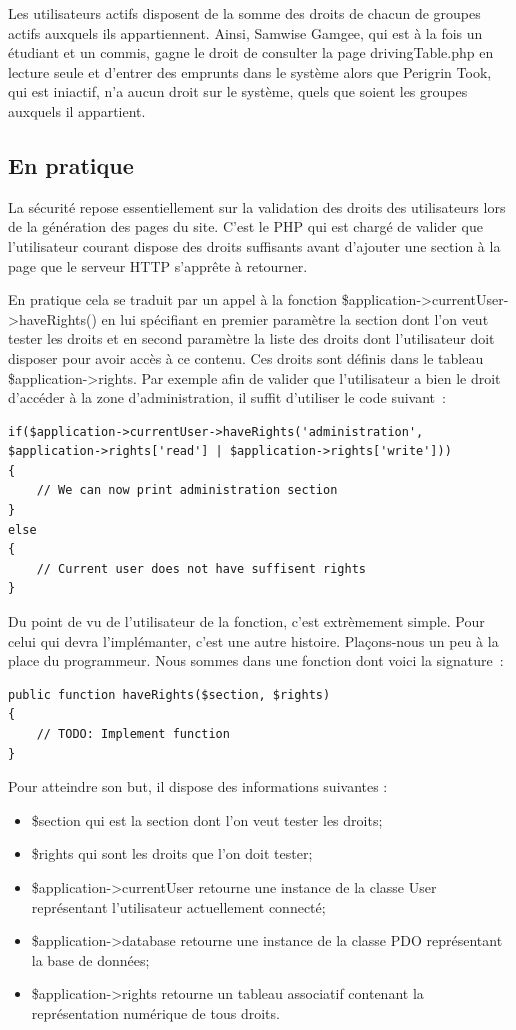 \documentclass[letter, 10pt]{report}
\begin{document}
Les utilisateurs actifs disposent de la somme des droits de chacun de groupes actifs auxquels ils appartiennent. Ainsi, Samwise Gamgee, qui est à la fois un étudiant et un commis, gagne le droit de consulter la page drivingTable.php en lecture seule et d'entrer des emprunts dans le système alors que Perigrin Took, qui est iniactif, n'a aucun droit sur le système, quels que soient les groupes auxquels il appartient.

\subsection{En pratique}
La sécurité repose essentiellement sur la validation des droits des utilisateurs lors de la génération des pages du site. C'est le PHP qui est chargé de valider que l'utilisateur courant dispose des droits suffisants avant d'ajouter une section à la page que le serveur HTTP s’apprête à retourner.

En pratique cela se traduit par un appel à la fonction \$application->currentUser->haveRights() en lui spécifiant en premier paramètre la section dont l'on veut tester les droits et en second paramètre la liste des droits dont l'utilisateur doit disposer pour avoir accès à ce contenu. Ces droits sont définis dans le tableau \$application->rights. Par exemple afin de valider que l'utilisateur a bien le droit d'accéder à la zone d'administration, il suffit d'utiliser le code suivant~:

\begin{lstlisting}[style=php]
if($application->currentUser->haveRights('administration', $application->rights['read'] | $application->rights['write']))
{
	// We can now print administration section
}
else
{
	// Current user does not have suffisent rights
}
\end{lstlisting}

Du point de vu de l'utilisateur de la fonction, c'est extrèmement simple. Pour celui qui devra l'implémanter, c'est une autre histoire. Plaçons-nous un peu à la place du programmeur. Nous sommes dans une fonction dont voici la signature~:

\begin{lstlisting}[style=php]
public function haveRights($section, $rights)
{
	// TODO: Implement function
}
\end{lstlisting}

Pour atteindre son but, il dispose des informations suivantes :

\begin{itemize}
	\item \$section qui est la section dont l'on veut tester les droits;
	\item \$rights qui sont les droits que l'on doit tester;
	\item \$application->currentUser retourne une instance de la classe User représentant l'utilisateur actuellement connecté;
	\item \$application->database retourne une instance de la classe PDO représentant la base de données;
	\item \$application->rights retourne un tableau associatif contenant la représentation numérique de tous droits.
\end{itemize}
\end{document}
